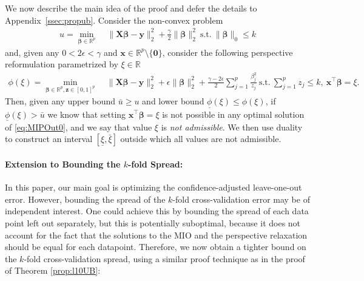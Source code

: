 \documentclass[opre,nonblindrev]{informs3} %
\begin{document}
	We now describe the main idea of the proof and defer the details to Appendix~\ref{ssec:propub}. Consider the non-convex problem 
	\begin{equation}\label{eq:MIPOut0}
		\begin{aligned}
			u=\min_{\bm{\beta}\in \mathbb{R}^p}\;& \|\bm{X}\bm{\beta}-\bm{y}\|_2^2+\frac{\gamma}{2}\|\bm{\beta}\|_2^2\ \text{s.t.}\ \|\bm{\beta}\|_0\leq k
		\end{aligned}
	\end{equation}
	and, given any $0<2 \epsilon<\gamma$ and $\bm{x}\in \mathbb{R}^p\setminus \{\bm{0}\}$, consider the following perspective reformulation parametrized by $\xi\in \mathbb{R}$
	\begin{align*}
		\phi(\xi)=\min_{\bm{\beta}\in \mathbb{R}^p,\bm{z}\in [0,1]^p}\;& \|\bm{X}\bm{\beta}-\bm{y}\|_2^2+\epsilon\|\bm{\beta}\|_2^2+\frac{\gamma-2\epsilon}{2}\sum_{j=1}^p \frac{\beta_j^2}{z_j}\ \text{s.t.}\ \sum_{j=1}^p z_j\leq k,\ \bm{x^\top \beta}=\xi.
	\end{align*}
	Then, given any upper bound $\bar u\geq u$ and lower bound $\underline{\phi}(\xi)\leq \phi(\xi)$, if $\underline{\phi}(\xi)>\bar u$ we know that setting $\bm{x^\top \beta}=\xi$ is not possible in any optimal solution of \eqref{eq:MIPOut0}, and we say that value $\xi$ is \emph{not admissible}. We then use duality to construct an interval $[\underline{\xi},\bar \xi]$ outside which all values are not admissible. 
\Halmos
	
\endproof

\paragraph{Extension to Bounding the $k$-fold Spread:\\}
In this paper, our main goal is optimizing the confidence-adjusted leave-one-out error. However, bounding the spread of the $k$-fold cross-validation error may be of independent interest. One could achieve this by bounding the spread of each data point left out separately, but this is potentially suboptimal, because it does not account for the fact that the solutions to the MIO and the perspective relaxation should be equal for each datapoint. Therefore, we now obtain a tighter bound on the $k$-fold cross-validation spread, using a similar proof technique as in the proof of Theorem \ref{prop:l10UB}:
\end{document}
